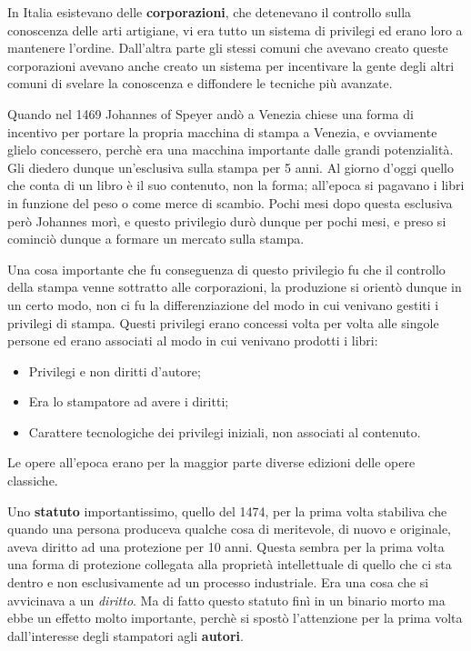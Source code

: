 In Italia esistevano delle \textbf{corporazioni}, che detenevano il controllo sulla conoscenza delle arti artigiane, vi era tutto un sistema di privilegi ed erano loro a mantenere l'ordine. Dall'altra parte gli stessi comuni che avevano creato queste corporazioni avevano anche creato un sistema per incentivare la gente degli altri comuni di svelare la conoscenza e diffondere le tecniche più avanzate. 

Quando nel 1469 Johannes of Speyer andò a Venezia chiese una forma di incentivo per portare la propria macchina di stampa a Venezia, e ovviamente glielo concessero, perchè era una macchina importante dalle grandi potenzialità. Gli diedero dunque un'esclusiva sulla stampa per 5 anni. Al giorno d'oggi quello che conta di un libro è il suo contenuto, non la forma; all'epoca si pagavano i libri in funzione del peso o come merce di scambio. Pochi mesi dopo questa esclusiva però Johannes morì, e questo privilegio durò dunque per pochi mesi, e preso si cominciò dunque a formare un mercato sulla stampa. 

Una cosa importante che fu conseguenza di questo privilegio fu che il controllo della stampa venne sottratto alle corporazioni, la produzione si orientò dunque in un certo modo, non ci fu la differenziazione del modo in cui venivano gestiti i privilegi di stampa. Questi privilegi erano concessi volta per volta alle singole persone ed erano associati al modo in cui venivano prodotti i libri:

\begin{itemize}

\item Privilegi e non diritti d'autore; 
\item Era lo stampatore ad avere i diritti;
\item Carattere tecnologiche dei privilegi iniziali, non associati al contenuto.

\end{itemize}

Le opere all'epoca erano per la maggior parte diverse edizioni delle opere classiche.

Uno \textbf{statuto} importantissimo, quello del 1474, per la prima volta stabiliva che quando una persona produceva qualche cosa di meritevole, di nuovo e originale, aveva diritto ad una protezione per 10 anni. Questa sembra per la prima volta una forma di protezione collegata alla proprietà intellettuale di quello che ci sta dentro e non esclusivamente ad un processo industriale. Era una cosa che si avvicinava a un \textit{diritto}. Ma di fatto questo statuto finì in un binario morto ma ebbe un effetto molto importante, perchè si spostò l'attenzione per la prima volta dall'interesse degli stampatori agli \textbf{autori}. 

